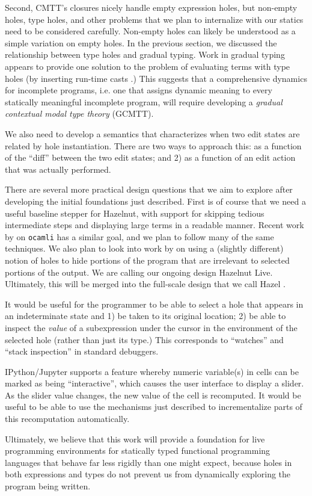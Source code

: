 Second, CMTT's closures nicely handle empty expression holes, but non-empty holes, type holes, and other problems that we plan to internalize with our statics need to be considered carefully. Non-empty holes can likely be understood as a simple variation on empty holes. In the previous section, we discussed the relationship between type holes and gradual typing. Work in gradual typing appears to provide one solution to the problem of evaluating terms with type holes (by inserting run-time casts \cite{Siek06a}.) This suggests that a comprehensive dynamics for incomplete programs, i.e. one that assigns dynamic meaning to every statically meaningful incomplete program, will require developing a \emph{gradual contextual modal type theory} (GCMTT).

We also need to develop a semantics that characterizes when two edit states are related by hole instantiation. There are two ways to approach this: as a function of the ``diff'' between the two edit states; and 2) as a function of an edit action that was actually performed.

There are several more practical design questions that we aim to explore after developing the initial foundations just described. First is of course that we need a useful baseline stepper for Hazelnut, with support for skipping tedious intermediate steps and displaying large terms in a readable manner. Recent work by \citet{ocaml-stepper} on \texttt{ocamli} has a similar goal, and we plan to follow many of the same techniques. We also plan to look into work by \citet{DBLP:conf/icfp/PereraACL12} on using a (slightly different) notion of holes to hide portions of the program that are irrelevant to selected portions of the output. We are calling our ongoing design Hazelnut Live. Ultimately, this will be merged into the full-scale design that we call Hazel \cite{snapl17-paper}.

It would be useful for the programmer to be able to select a hole that appears in an indeterminate state and 1) be taken to its original location; 2) be able to inspect the \emph{value} of a subexpression under the cursor in the environment of the selected hole (rather than just its type.) This corresponds to ``watches'' and ``stack inspection'' in standard debuggers.

IPython/Jupyter \cite{PER-GRA:2007} supports a feature whereby numeric variable(s) in cells can be marked as being ``interactive'', which causes the user interface to display a slider. As the slider value changes, the new value of the cell is recomputed. It would be useful to be able to use the mechanisms just described to incrementalize parts of this recomputation automatically.

Ultimately, we believe that this work will provide a foundation for live programming environments for statically typed functional programming languages that behave far less rigidly than one might expect, because holes in both expressions and types do not prevent us from dynamically exploring the program being written.